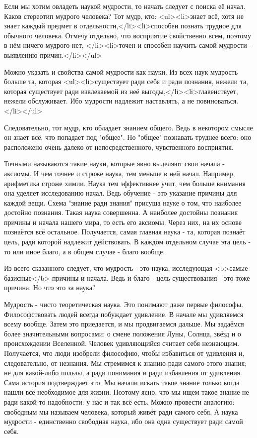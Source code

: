 \documentclass{article}
\begin{document}
Если мы хотим овладеть наукой мудрости, то начать следует с поиска её начал. Каков стереотип мудрого человека? Тот мудр, кто: <ul><li>знает всё, хотя не знает каждый предмет в отдельности,</li><li>способен познать трудное для обычного человека. Отмечу отдельно, что восприятие свойственно всем, поэтому в нём ничего мудрого нет,
\footnotemark[1]
</li><li>точен и способен научить самой мудрости - выявлению причин.</li></ul>

Можно указать и свойства самой мудрости как науки. Из всех наук мудрость больше та, которая <ul><li>существует ради себя и ради познания, нежели та, которая существует ради извлекаемой из неё выгоды,</li><li>главенствует, нежели обслуживает. Ибо мудрости надлежит наставлять, а не повиноваться.</li></ul>

Следовательно, тот мудр, кто обладает знанием общего. Ведь в некотором смысле он знает всё, что попадает под "общее". Но "общее" познавать труднее всего: оно расположено очень далеко от непосредственного, чувственного восприятия.

Точными называются такие науки, которые явно выделяют свои начала - аксиомы. И чем точнее и строже наука, тем меньше в ней начал. Например, арифметика строже химии. Наука тем эффективнее учит, чем больше внимания она уделяет исследованию начал. Ведь обучение - это указание причины для каждой вещи. Схема "знание ради знания" присуща науке о том, что наиболее достойно познания. Такая наука совершенна. А наиболее достойны познания причины и начала нашего мира, то есть его аксиомы. Через них, на их основе познаётся всё остальное. Получается, самая главная наука - та, которая познаёт цель, ради которой надлежит действовать. В каждом отдельном случае эта цель - то или иное благо, а в общем случае - благо вообще.

Из всего сказанного следует, что мудрость - это наука, исследующая <b>самые базисные</b> причины и начала. Ведь и благо - цель существования - это тоже причина.
\footnotemark[2]
Но что это за наука?

Мудрость - чисто теоретическая наука. Это понимают даже первые философы. Философствовать людей всегда побуждает удивление. В начале мы удивляемся всему вообще. Затем это приедается, и мы продвигаемся дальше. Мы задаёмся более значительными вопросами: о смене положения Луны, Солнца, звёзд и о происхождении Вселенной. Человек удивляющийся считает себя незнающим. Получается, что люди изобрели философию, чтобы избавиться от удивления и, следовательно, от незнания. Мы стремимся к знанию ради самого этого знания; не для какой-либо пользы, а ради понимания и ради избавления от удивления. Сама история подтверждает это. Мы начали искать такое знание только когда нашли всё необходимое для жизни. Поэтому ясно, что мы ищем такое знание не ради какой-то надобности: у нас и так всё есть. Можно провести аналогию: свободным мы называем человека, который живёт ради самого себя. А наука мудрости - единственно свободная наука, ибо она одна существует ради самой себя.
\footnotemark[3]
\end{document}
